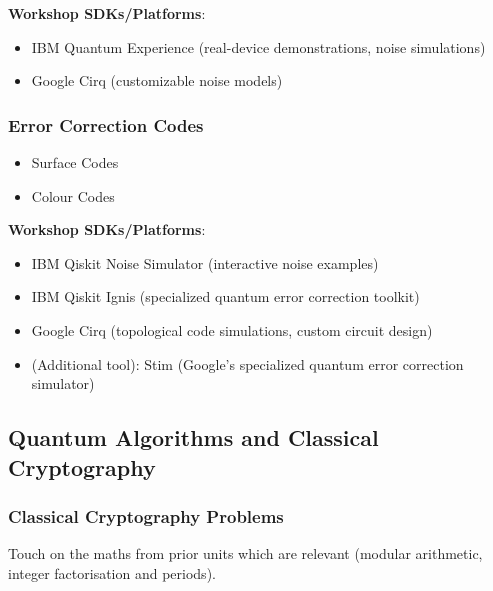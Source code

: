 \textbf{Workshop SDKs/Platforms}:

\begin{itemize}
	\item IBM Quantum Experience (real-device demonstrations, noise simulations)
	\item Google Cirq (customizable noise models)
\end{itemize}


\subsubsection{Error Correction Codes}
	
\begin{itemize}
	\item Surface Codes
	\item Colour Codes
\end{itemize}

\textbf{Workshop SDKs/Platforms}:

\begin{itemize}
	\item IBM Qiskit Noise Simulator (interactive noise examples)
	\item IBM Qiskit Ignis (specialized quantum error correction toolkit)
	\item Google Cirq (topological code simulations, custom circuit design)
	\item (Additional tool): Stim (Google's specialized quantum error correction simulator)
\end{itemize}


\subsection{Quantum Algorithms and Classical Cryptography}


\subsubsection{Classical Cryptography Problems}

Touch on the maths from prior units which are relevant (modular arithmetic, integer factorisation and periods).



